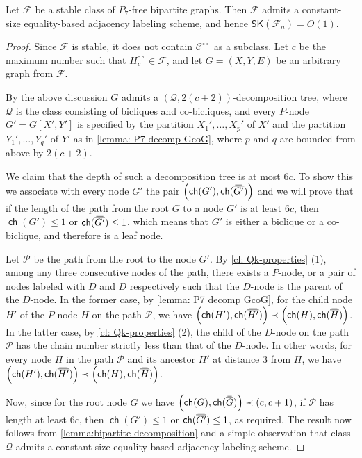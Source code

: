 \documentclass{theoretics}
\newcommand{\cC}{\ensuremath{\mathcal{C}}}
\newcommand{\cF}{\ensuremath{\mathcal{F}}}
\newcommand{\cP}{\ensuremath{\mathcal{P}}}
\newcommand{\cQ}{\ensuremath{\mathcal{Q}}}
\newcommand\doverline[1]{%
  \setbox0=\hbox{$\!\overline{#1}\!$}%
  \ht0=\dimexpr\ht0-.2ex\relax%
  \,\overline{\copy0}\,%
}
\newcommand{\bc}[1]{\doverline{#1}} %
\newcommand{\RL}{\mathsf{SK}}
\DeclareMathOperator\ch{\mathsf{ch}}
\newcommand{\dcirc}{{\circ\circ}}
\begin{document}
\begin{theorem}
	\label{th:P7 labeling}
	Let $\cF$ be a stable class of $P_7$-free bipartite graphs.
	Then $\cF$ admits a constant-size equality-based adjacency labeling scheme, and hence $\RL(\cF_n) = O(1)$.
\end{theorem}
\begin{proof}
	Since $\cF$ is stable, it does not contain $\cC^\dcirc$ as a subclass.
	Let $c$ be the maximum number such that $H^{\circ\circ}_c \in \cF$,
	and let $G=(X,Y,E)$ be an arbitrary graph from $\cF$.
	
	By the above discussion $G$ admits
	a $(\cQ, 2(c+2))$-decomposition tree, where $\cQ$ is the class consisting of bicliques and co-bicliques, and every $P$-node $G' = G[X',Y']$ is specified
	by the partition $X_1', \ldots, X_p'$ of $X'$ and the partition $Y_1', \ldots, Y_q'$ of $Y'$
	as in \cref{lemma: P7 decomp GcoG}, where $p$ and $q$ are bounded from above by $2(c+2)$.
	
	We claim that the depth of such a decomposition tree is at most $6c$.
	To show this we associate with every node $G'$ the pair $\left( \ch(G'), \ch(\bc{G'}) \right)$
	and we will prove that if the length of the path from  the root $G$ to a node $G'$ is at least
	$6c$, then $\ch(G') \leq 1$ or $\ch(\bc{G'}) \leq 1$, which means that $G'$ is either
	a biclique or a co-biclique, and therefore is a leaf node.
	
	Let $\cP$ be the path from the root to the node $G'$.
	By \cref{cl: Qk-properties} (1), among any three consecutive nodes of the path,
	there exists a $P$-node, or a pair of nodes labeled with $\overline D$ and $D$ respectively
	such that the $\overline D$-node is the parent of the $D$-node.
	In the former case, by \cref{lemma: P7 decomp GcoG}, 
	for the child node $H'$ of the $P$-node $H$ on the path $\cP$, we have 
	$\left( \ch(H'), \ch(\bc{H'}) \right) \prec \left( \ch(H), \ch(\bc{H}) \right)$.
	In the latter case, by \cref{cl: Qk-properties} (2), the child of the $D$-node
	on the path $\cP$ has the chain number strictly less than that of the $D$-node.
	In other words, for every node $H$ in the path $\cP$ and its ancestor $H'$ at distance
	$3$ from $H$, we have  $\left( \ch(H'), \ch(\bc{H'}) \right) \prec \left( \ch(H), \ch(\bc{H}) \right)$.
	
	Now, since for the root node $G$ we have $\left( \ch(G), \ch(\bc{G}) \right) \prec (c, c+1)$,
	if $\cP$ has length at least $6c$, then $\ch(G') \leq 1$ or $\ch(\bc{G'}) \leq 1$, as required. 
	The result now follows from \cref{lemma:bipartite decomposition} and a simple observation
	that class $\cQ$ admits a constant-size equality-based adjacency labeling scheme.
\end{proof}
\end{document}
